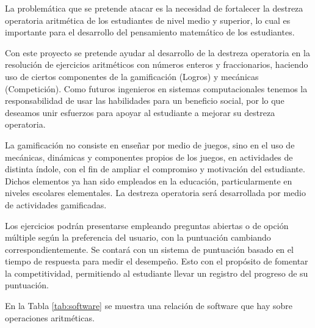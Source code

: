 \documentclass{article}
\begin{document}
La problemática que se pretende atacar es la necesidad de fortalecer la destreza 
operatoria aritmética de los estudiantes de nivel medio y superior\cite{gusty2005importance,tariq2002decline}, 
lo cual es importante para el desarrollo del pensamiento matemático de los estudiantes.


Con este proyecto se pretende ayudar al desarrollo de la destreza operatoria en la 
resolución de ejercicios aritméticos con números enteros y fraccionarios, haciendo 
uso de ciertos componentes de la gamificación (Logros) y mecánicas (Competición). 
Como futuros ingenieros en sistemas computacionales tenemos la responsabilidad de usar 
las habilidades para un beneficio social, por lo que deseamos unir esfuerzos para apoyar 
al estudiante a mejorar su destreza operatoria.


La gamificación no consiste en enseñar por medio de juegos, sino en el uso de mecánicas, 
dinámicas y componentes propios de los juegos, en actividades de distinta índole, con 
el fin de ampliar el compromiso y motivación del estudiante\cite{tariq2002decline}. 
Dichos elementos ya han sido empleados en la educación, particularmente en niveles 
escolares elementales\cite{rodrigues2017math}. La destreza operatoria será desarrollada 
por medio de actividades gamificadas.  


Los ejercicios podrán presentarse empleando preguntas abiertas o de opción múltiple 
según la preferencia del usuario, con la puntuación cambiando correspondientemente. 
Se contará con un sistema de puntuación basado en el tiempo de respuesta para medir 
el desempeño. Esto con el propósito de fomentar la competitividad, permitiendo al 
estudiante llevar un registro del progreso de su puntuación.

En la Tabla \ref{tab:software} se muestra una relación de software que hay sobre
operaciones aritméticas.
\end{document}
